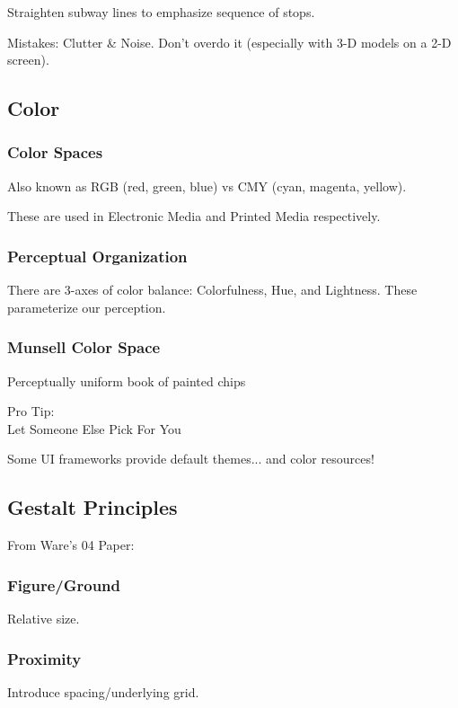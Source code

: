 Straighten subway lines to emphasize sequence of stops.

\begin{important}
Mistakes: Clutter \& Noise. Don't overdo it (especially with 3-D models on a 2-D screen).
\end{important}

\subsection{ Color}
\subsubsection{Color Spaces}
Also known as RGB (red, green, blue) vs CMY (cyan, magenta, yellow).

These are used in Electronic Media and Printed Media respectively.

\subsubsection{Perceptual Organization}
There are 3-axes of color balance: Colorfulness, Hue, and Lightness. These parameterize our perception.

\subsubsection{Munsell Color Space}
Perceptually uniform book of painted chips

\begin{shaded}
Pro Tip:\\
Let Someone Else Pick For You
\end{shaded}

Some UI frameworks provide default themes... and color resources!

\subsection{ Gestalt Principles}
From Ware's 04 Paper:

\subsubsection{Figure/Ground}
Relative size.

\subsubsection{Proximity}
Introduce spacing/underlying grid.

